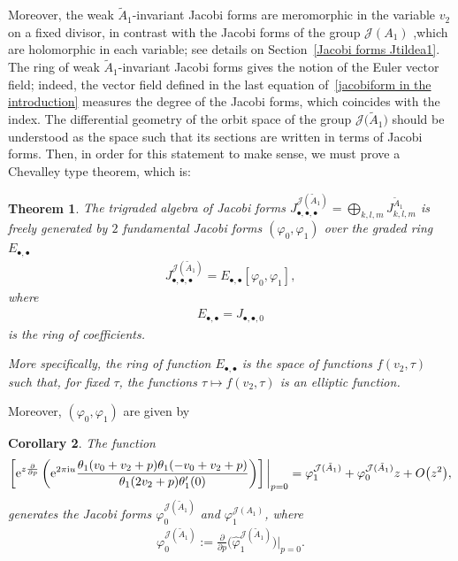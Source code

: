 \documentclass[10pt,a4paper]{amsart}
\numberwithin{equation}{section}
\newtheorem{Theorem}{Theorem}[section]
\newtheorem{Corollary}[Theorem]{Corollary}
\newcommand{\Ja}{\mathcal{J}}
\begin{document}
Moreover, the weak $\tilde A_1$-invariant Jacobi forms are meromorphic in the variable $v_{2}$ on a fixed divisor, in contrast with the Jacobi forms of the group $\Ja(A_1)$ ,which are holomorphic in each variable; see details on Section~\ref{Jacobi forms Jtildea1}. The ring of weak $\tilde A_1$-invariant Jacobi forms gives the notion of the Euler vector field; indeed, the vector field defined in the last equation of~\eqref{jacobiform in the introduction} measures the degree of the Jacobi forms, which coincides with the index. The differential geometry of the orbit space of the group $\Ja\big(\tilde A_1\big)$ should be understood as the space such that its sections are written in terms of Jacobi forms. Then, in order for this statement to make sense, we must prove a Chevalley type theorem, which is:

\begin{Theorem}%
The trigraded algebra of Jacobi forms $J_{\bullet,\bullet,\bullet}^{\Ja(\tilde A_{1})}=\bigoplus _{k,l,m}J_{k,l,m}^{\tilde A_{1}}$ is freely generated by $2$ fundamental Jacobi forms $(\varphi_0,\varphi_1)$ over the graded ring $E_{\bullet,\bullet}$
\begin{gather*}
J_{\bullet,\bullet,\bullet}^{\Ja(\tilde A_1)}=E_{\bullet,\bullet}\left[\varphi_0,\varphi_1\right],
\end{gather*}
where
\begin{gather*}
E_{\bullet,\bullet}=J_{\bullet,\bullet,0}
\end{gather*}
is the ring of coefficients.

More specifically, the ring of function $E_{\bullet,\bullet}$ is the space of functions $f(v_{2},\tau)$ such that, for fixed $\tau$, the functions $\tau\mapsto f(v_{2},\tau)$ is an elliptic function.
\end{Theorem}
Moreover, $(\varphi_0,\varphi_1)$ are given by

\begin{Corollary}
The function
\begin{gather*}
\left[{\rm e}^{z\frac{\partial}{\partial p}} \left({\rm e}^{2\pi {\rm i}u} \frac{\theta_1(v_0+v_2+p)\theta_1(-v_0+v_2+p)}{\theta_1(2v_2+p)\theta_1^{\prime}(0)}\right) \right]
\bigg|_{p=0}=\varphi_1^{\Ja(\tilde A_1)}+\varphi_0^{\Ja(\tilde A_1)}z+O\big(z^2\big),
\end{gather*}
generates the Jacobi forms $\varphi_0^{\Ja(\tilde A_1)}$ and $\varphi_1^{\Ja(A_1)}$,
where
\begin{gather*}
\varphi_0^{\Ja(\tilde A_1)}:=\frac{\partial }{\partial p}\big(\hat\varphi_1^{\Ja(\tilde A_1)} \big)\bigg|_{p=0}.
\end{gather*}
\end{Corollary}
\end{document}
